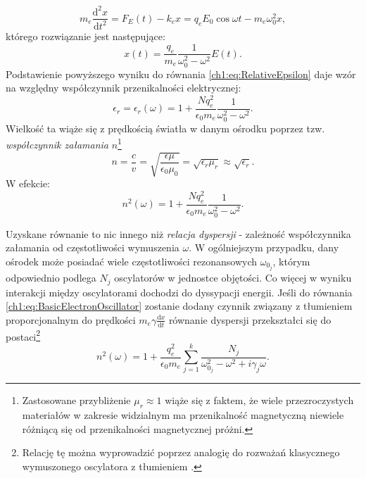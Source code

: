 \begin{equation}
m_e\frac{\mathrm{d^2}x}{\mathrm{d}t^2} = F_E(t) - k_ex = q_eE_0\cos\omega t - m_e\omega_0^2x,
\label{ch1:eq:BasicElectronOscillator}
\end{equation}
którego rozwiązanie jest następujące:
\begin{equation}
x(t) = \frac{q_e}{m_e}\frac{1}{\omega_0^2 - \omega^2 }E(t).
\end{equation}
Podstawienie powyższego wyniku do równania \eqref{ch1:eq:RelativeEpsilon} daje wzór na względny współczynnik przenikalności elektrycznej:
\begin{equation}
\epsilon_r = \epsilon_r(\omega) = 1 + \frac{Nq_e^2}{\epsilon_0m_e}\frac{1}{\omega_0^2 - \omega^2}.
\label{ch1:eq:GeneralRelativeEpsilon}
\end{equation}
Wielkość ta wiąże się z prędkością światła w danym ośrodku poprzez tzw. \textit{współczynnik załamania} $n$\footnote{Zastosowane przybliżenie $\mu_r\approx 1$ wiąże się z faktem, że wiele przezroczystych materiałów w zakresie widzialnym ma przenikalność magnetyczną niewiele różniącą się od przenikalności magnetycznej próżni.}
\begin{equation}
n = \frac{c}{v} = \sqrt{\frac{\epsilon\mu}{\epsilon_0\mu_0}} = \sqrt{\epsilon_r\mu_r}\approx\sqrt{\epsilon_r}.
\end{equation}
W efekcie:
\begin{equation}
n^2(\omega) = 1 + \frac{Nq_e^2}{\epsilon_0m_e}\frac{1}{\omega_0^2 - \omega^2}.
\label{ch1:eq:RefractionCoeff}
\end{equation}

Uzyskane równanie to nic innego niż \textit{relacja dyspersji} - zależność współczynnika załamania od częstotliwości wymuszenia $\omega$. W ogólniejszym przypadku, dany ośrodek może posiadać wiele częstotliwości rezonansowych $\omega_{0_j}$, którym odpowiednio podlega $N_j$ oscylatorów w jednostce objętości. Co więcej w wyniku interakcji między oscylatorami dochodzi do dyssypacji energii. Jeśli do równania \eqref{ch1:eq:BasicElectronOscillator} zostanie dodany czynnik związany z tłumieniem proporcjonalnym do prędkości $m_e\gamma\frac{\mathrm{d}x}{\mathrm{d}t}$ równanie dyspersji przekształci się do postaci\footnote{Relację tę można wyprowadzić poprzez analogię do rozważań klasycznego wymuszonego oscylatora z tłumieniem \cite{RUBINOWICZ_KROLIKOWSKI}.}
\begin{equation}
n^2(\omega) = 1 + \frac{q_e^2}{\epsilon_0m_e}\sum_{j=1}^k\frac{N_j}{\omega_{0_j}^2 - \omega^2 + i\gamma_j\omega}.
\label{ch1:eq:GeneralRefractionCoeff}
\end{equation}

